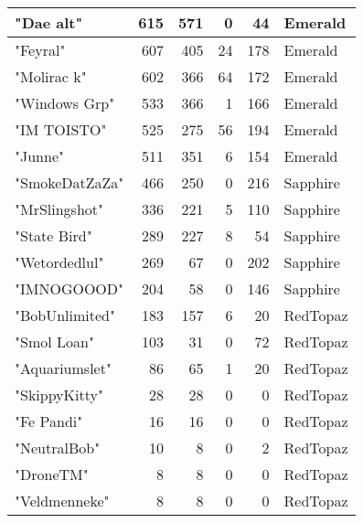 \documentclass{article}
\begin{document}
\begin{table}[htbp]
\begin{tabular}{|l|r|r|r|r|l|}
"Dae alt" & 615 & 571 & 0 & 44 & Emerald \\ \hline
"Feyral" & 607 & 405 & 24 & 178 & Emerald \\ \hline
"Molirac k" & 602 & 366 & 64 & 172 & Emerald \\ \hline
"Windows Grp" & 533 & 366 & 1 & 166 & Emerald \\ \hline
"IM TOISTO" & 525 & 275 & 56 & 194 & Emerald \\ \hline
"Junne" & 511 & 351 & 6 & 154 & Emerald \\ \hline
"SmokeDatZaZa" & 466 & 250 & 0 & 216 & Sapphire \\ \hline
"MrSlingshot" & 336 & 221 & 5 & 110 & Sapphire \\ \hline
"State Bird" & 289 & 227 & 8 & 54 & Sapphire \\ \hline
"Wetordedlul" & 269 & 67 & 0 & 202 & Sapphire \\ \hline
"IMNOGOOOD" & 204 & 58 & 0 & 146 & Sapphire \\ \hline
"BobUnlimited" & 183 & 157 & 6 & 20 & RedTopaz \\ \hline
"Smol Loan" & 103 & 31 & 0 & 72 & RedTopaz \\ \hline
"Aquariumslet" & 86 & 65 & 1 & 20 & RedTopaz \\ \hline
"SkippyKitty" & 28 & 28 & 0 & 0 & RedTopaz \\ \hline
"Fe Pandi" & 16 & 16 & 0 & 0 & RedTopaz \\ \hline
"NeutralBob" & 10 & 8 & 0 & 2 & RedTopaz \\ \hline
"DroneTM" & 8 & 8 & 0 & 0 & RedTopaz \\ \hline
"Veldmenneke" & 8 & 8 & 0 & 0 & RedTopaz \\ \hline
\end{tabular}
\end{table}
\end{document}
